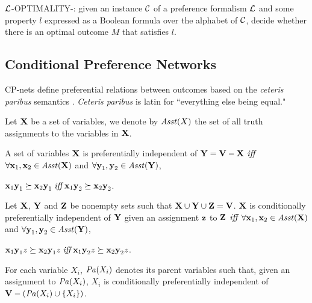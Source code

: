 \begin{definition}
\label{def:opt3}
  $\mathcal{L}$-OPTIMALITY-: given an instance $\mathcal{C}$ of a preference
	formalism $\mathcal{L}$ and some property $l$ expressed as a Boolean formula 
	over the alphabet of $\mathcal{C}$,
  decide whether there is an optimal outcome $M$ that satisfies $l$.
\end{definition}



\subsection{Conditional Preference Networks}
CP-nets define preferential relations between outcomes
based on the \textit{ceteris paribus}
semantics \cite{bbdh03}.
\textit{Ceteris paribus} is latin for ``everything else being equal."

Let $\textbf{X}$ be a set of variables, we denote by $\mathit{Asst}(X)$ the set of
all truth assignments to the variables in $\textbf{X}$.
\begin{definition}
\label{def:pi}
	A set of variables $\textbf{X}$ is preferentially independent
	of $\textbf{Y}=\textbf{V}-\textbf{X}$ $\textit{iff}$ $\forall \textbf{x}_1,\textbf{x}_2 \in \mathit{Asst}(\textbf{X})$ and
	$\forall \textbf{y}_1,\textbf{y}_2 \in \mathit{Asst}(\textbf{Y})$,
	\begin{center}
		$\textbf{x}_1\textbf{y}_1 \succeq \textbf{x}_2\textbf{y}_1 \; \textit{iff} \; \textbf{x}_1\textbf{y}_2 \succeq \textbf{x}_2\textbf{y}_2$.
	\end{center}
\end{definition}

\begin{definition}
\label{def:cpi}
	Let $\textbf{X}$, $\textbf{Y}$ and $\textbf{Z}$ be nonempty sets such that
	$\textbf{X} \cup \textbf{Y} \cup \textbf{Z} = \textbf{V}$.
	$\textbf{X}$ is conditionally preferentially independent
	of $\textbf{Y}$ given an assignment $\textbf{z}$ to $\textbf{Z}$ 
	$\textit{iff}$ $\forall \textbf{x}_1,\textbf{x}_2 \in \mathit{Asst}(\textbf{X})$ and
	$\forall \textbf{y}_1,\textbf{y}_2 \in \mathit{Asst}(\textbf{Y})$,
	\begin{center}
		$\textbf{x}_1\textbf{y}_1z \succeq \textbf{x}_2\textbf{y}_1z \; \textit{iff} \; \textbf{x}_1\textbf{y}_2z \succeq \textbf{x}_2\textbf{y}_2z$.
	\end{center}
\end{definition}

\begin{definition}
	For each variable $X_i$, $\mathit{Pa}(X_i)$ denotes its parent variables such that,
	given an assignment to $\mathit{Pa}(X_i)$, $X_i$ is conditionally preferentially independent
	of $\textbf{V}-(\mathit{Pa}(X_i) \cup \{X_i\})$.
\end{definition}

